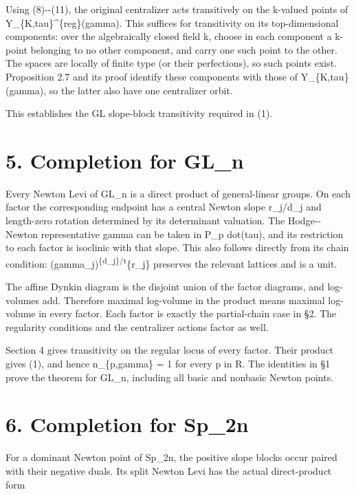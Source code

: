 \documentclass[11pt,a4paper]{article}
\begin{document}
Using (8)-\/-(11), the original centralizer acts transitively on the
k-valued points of Y\_\{K,tau\}\^{}\{reg\}(gamma). This suffices for
transitivity on its top-dimensional components: over the algebraically
closed field k, choose in each component a k-point belonging to no other
component, and carry one such point to the other. The spaces are locally
of finite type (or their perfections), so such points exist. Proposition
2.7 and its proof identify these components with those of
Y\_\{K,tau\}(gamma), so the latter also have one centralizer orbit.

This establishes the GL slope-block transitivity required in (1).

\section{5. Completion for GL\_n}\label{completion-for-gl_n}

Every Newton Levi of GL\_n is a direct product of general-linear groups.
On each factor the corresponding endpoint has a central Newton slope
r\_j/d\_j and length-zero rotation determined by its determinant
valuation. The Hodge-\/-Newton representative gamma\textquotesingle{}
can be taken in P\_p dot(tau), and its restriction to each factor is
isoclinic with that slope. This also follows directly from its chain
condition:
(gamma\textquotesingle\_j)\textsuperscript{\{d\_j\}/t}\{r\_j\} preserves
the relevant lattices and is a unit.

The affine Dynkin diagram is the disjoint union of the factor diagrams,
and log-volumes add. Therefore maximal log-volume in the product means
maximal log-volume in every factor. Each factor is exactly the
partial-chain case in §2. The regularity conditions and the centralizer
actions factor as well.

Section 4 gives transitivity on the regular locus of every factor. Their
product gives (1), and hence n\_\{p,gamma\} = 1 for every p in R. The
identities in §1 prove the theorem for GL\_n, including all basic and
nonbasic Newton points.

\section{6. Completion for Sp\_2n}\label{completion-for-sp_2n}

For a dominant Newton point of Sp\_2n, the positive slope blocks occur
paired with their negative duals. Its split Newton Levi has the actual
direct-product form
\end{document}
